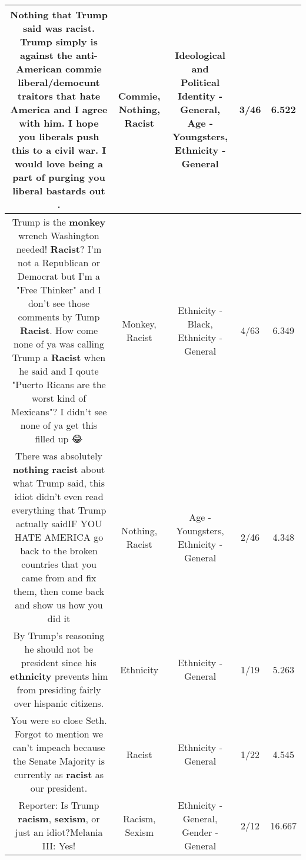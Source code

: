 \documentclass[11pt]{article}
\newlength\mylength
\begin{document}
\begin{center}
\begin{longtable}{|C{.65\mylength}|C{.30\mylength}|C{.12\mylength}|C{.12\mylength}|C{.12\mylength}|}
  \small Nothing that Trump said was \textbf{racist}. Trump simply is against the anti-American \textbf{commie} liberal/democunt traitors that hate America and I agree with him. I hope you liberals push this to a civil war. I would love being a part of purging you liberal bastards out .\normalsize   & Commie, Nothing, Racist &  Ideological and Political Identity - General, Age - Youngsters, Ethnicity - General & 3/46 & 6.522 \\  \hline
  \small Trump is the \textbf{monkey} wrench Washington needed! \textbf{Racist}? I'm not a Republican or Democrat but I'm a "Free Thinker" and I don't see those comments by Tump \textbf{Racist}. How come none of ya was calling Trump a \textbf{Racist} when he said and I qoute "Puerto Ricans are the worst kind of Mexicans"? I didn't see none of ya get this filled up 😂\normalsize   & Monkey, Racist & Ethnicity - Black, Ethnicity - General & 4/63 & 6.349 \\  \hline
  \small There was absolutely \textbf{nothing}  \textbf{racist} about what Trump said, this idiot didn't even read everything that Trump actually saidIF YOU HATE AMERICA go back to the broken countries that you came from and fix them, then come back and show us how you did it\normalsize   & Nothing, Racist & Age - Youngsters, Ethnicity - General & 2/46 & 4.348 \\  \hline
  \small By Trump's reasoning he should not be president since his \textbf{ethnicity} prevents him from presiding fairly over hispanic citizens.\normalsize   & Ethnicity & Ethnicity - General & 1/19 & 5.263 \\  \hline
  \small You were so close Seth. Forgot to mention we can't impeach because the Senate Majority is currently as \textbf{racist} as our president.\normalsize   & Racist & Ethnicity - General & 1/22 & 4.545 \\  \hline
  \small Reporter:  Is Trump \textbf{racism}, \textbf{sexism}, or just an idiot?Melania III:  Yes!\normalsize   & Racism, Sexism & Ethnicity - General, Gender - General & 2/12 & 16.667 \\  \hline

\end{longtable}
\end{center}
\end{document}
